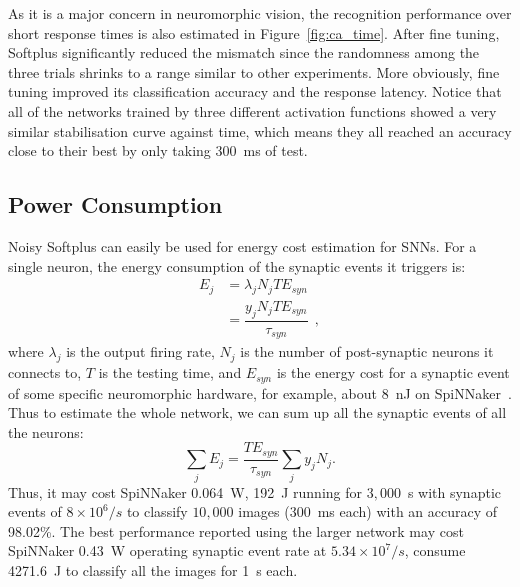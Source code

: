 	As it is a major concern in neuromorphic vision, the recognition performance over short response times is also estimated in Figure~\ref{fig:ca_time}.
	After fine tuning, Softplus significantly reduced the mismatch since the randomness among the three trials shrinks to a range similar to other experiments.
	More obviously, fine tuning improved its classification accuracy and the response latency.
	Notice that all of the networks trained by three different activation functions showed a very similar stabilisation curve against time, which means they all reached an accuracy close to their best by only taking 300~ms of test. 
	
	
	\subsection{Power Consumption}
	Noisy Softplus can easily be used for energy cost estimation for SNNs.
	For a single neuron, the energy consumption of the synaptic events it triggers is:
	\begin{equation}
	\begin{aligned}
	E_{j} &= \lambda_j N_j T E_{syn}\\
	&= \dfrac{y_j N_j T E_{syn}}{\tau_{syn}}~~,
	\end{aligned}
	\label{equ:energy}
	\end{equation}
	where $\lambda_j$ is the output firing rate, $N_j$ is the number of post-synaptic neurons it connects to, $T$ is the testing time, and $E_{syn}$ is the energy cost for a synaptic event of some specific neuromorphic hardware, for example, about 8~nJ on SpiNNaker~\cite{stromatias2013power}.
	Thus to estimate the whole network, we can sum up all the synaptic events of all the neurons:
	\begin{equation}
	\sum_j E_{j} =  \dfrac{T E_{syn}}{\tau_{syn}} \sum_{j}y_j N_j.
	\end{equation}
	Thus, it may cost SpiNNaker 0.064~W, 192~J running for $3,000$~s with synaptic events of $8\times10^6/s$ to classify $10,000$ images (300~ms each) with an accuracy of 98.02\%.
	The best performance reported using the larger network may cost SpiNNaker 0.43~W operating synaptic event rate at $5.34\times10^7/s$, consume 4271.6~J to classify all the images for 1~s each.

